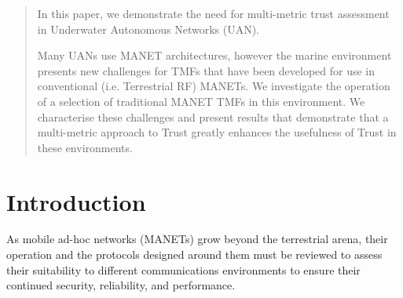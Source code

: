 \documentclass[conference]{IEEEtran}
\begin{document}
\maketitle


\begin{abstract}
In this paper, we demonstrate the need for multi-metric trust assessment in Underwater Autonomous Networks (UAN).

Many UANs use MANET architectures, however the marine environment presents new challenges for TMFs that have been developed for use in conventional (i.e. Terrestrial RF) MANETs.
We investigate the operation of a selection of traditional MANET TMFs in this environment.
We characterise these challenges and present results that demonstrate that a multi-metric approach to Trust greatly enhances the usefulness of Trust in these environments.

\end{abstract}





%
\IEEEpeerreviewmaketitle



\section{Introduction}\label{sec:introduction}

As mobile ad-hoc networks (MANETs) grow beyond the terrestrial arena, their operation and the protocols designed around them must be reviewed to assess their suitability to different communications environments to ensure their continued security, reliability, and performance.
\end{document}
